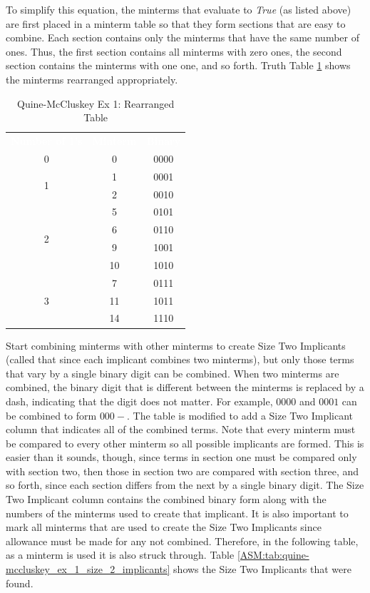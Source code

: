 To simplify this equation, the minterms that evaluate to \emph{True} (as listed above) are first placed in a minterm table so that they form sections that are easy to combine. Each section contains only the minterms that have the same number of ones. Thus, the first section contains all minterms with zero ones, the second section contains the minterms with one one, and so forth. Truth Table \ref{ASM:tab:qm_ex_1_rearranged_table} shows the minterms rearranged appropriately.

\begin{table}[H]
	\sffamily
	\newcommand{\head}[1]{\textcolor{white}{\textbf{#1}}}		
	\begin{center}
		\begin{tabular}{ccc} 
			\rowcolor{black!75}
			\head{Number of 1's} & \head{Minterm} & \head{Binary} \\
			0 & 0 & 0000 \\
			\hline
			\multirow{2}{*}{1} & 1 & 0001 \\
							   & 2 & 0010 \\
			\hline
			\multirow{4}{*}{2} & 5  & 0101 \\
							   & 6  & 0110 \\		
							   & 9  & 1001 \\		
							   & 10 & 1010 \\
			\hline
			\multirow{3}{*}{3} & 7  & 0111 \\
							   & 11 & 1011 \\		
							   & 14 & 1110 \\
			\hline
		\end{tabular}
	\end{center}
	\caption{Quine-McCluskey Ex 1: Rearranged Table}
  \label{ASM:tab:qm_ex_1_rearranged_table}
\end{table}

Start combining minterms with other minterms to create Size Two Implicants (called that since each implicant combines two minterms), but only those terms that vary by a single binary digit can be combined. When two minterms are combined, the binary digit that is different between the minterms is replaced by a dash, indicating that the digit does not matter. For example, $ 0000 $ and $ 0001 $ can be combined to form $ 000- $. The table is modified to add a Size Two Implicant column that indicates all of the combined terms. Note that every minterm must be compared to every other minterm so all possible implicants are formed. This is easier than it sounds, though, since terms in section one must be compared only with section two, then those in section two are compared with section three, and so forth, since each section differs from the next by a single binary digit. The Size Two Implicant column contains the combined binary form along with the numbers of the minterms used to create that implicant. It is also important to mark all minterms that are used to create the Size Two Implicants since allowance must be made for any not combined. Therefore, in the following table, as a minterm is used it is also struck through. Table \ref{ASM:tab:quine-mccluskey_ex_1_size_2_implicants} shows the Size Two Implicants that were found.

